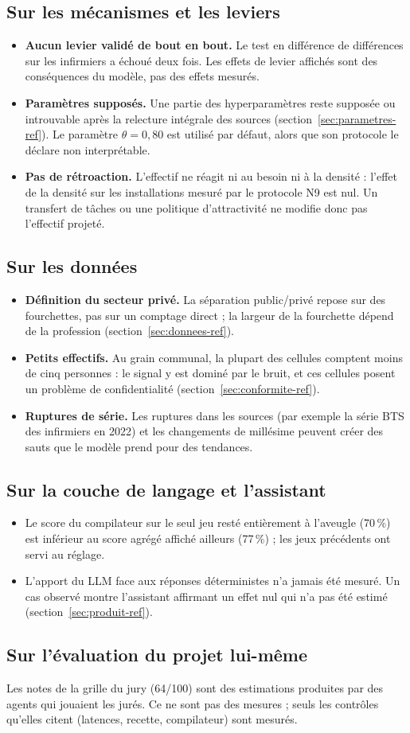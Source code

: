 \subsection{Sur les mécanismes et les leviers}
\begin{itemize}
\item \textbf{Aucun levier validé de bout en bout.} Le test en différence de différences sur les infirmiers a
  échoué deux fois. Les effets de levier affichés sont des conséquences du modèle, pas des effets mesurés.
\item \textbf{Paramètres supposés.} Une partie des hyperparamètres reste supposée ou introuvable après la relecture
  intégrale des sources (section~\ref{sec:parametres-ref}). Le paramètre $\theta = 0{,}80$ est utilisé par défaut,
  alors que son protocole le déclare non interprétable.
\item \textbf{Pas de rétroaction.} L'effectif ne réagit ni au besoin ni à la densité : l'effet de la densité sur les
  installations mesuré par le protocole N9 est nul. Un transfert de tâches ou une politique d'attractivité ne
  modifie donc pas l'effectif projeté.
\end{itemize}

\subsection{Sur les données}
\begin{itemize}
\item \textbf{Définition du secteur privé.} La séparation public/privé repose sur des fourchettes, pas sur un
  comptage direct ; la largeur de la fourchette dépend de la profession (section~\ref{sec:donnees-ref}).
\item \textbf{Petits effectifs.} Au grain communal, la plupart des cellules comptent moins de cinq personnes : le
  signal y est dominé par le bruit, et ces cellules posent un problème de confidentialité
  (section~\ref{sec:conformite-ref}).
\item \textbf{Ruptures de série.} Les ruptures dans les sources (par exemple la série BTS des infirmiers en 2022)
  et les changements de millésime peuvent créer des sauts que le modèle prend pour des tendances.
\end{itemize}

\subsection{Sur la couche de langage et l'assistant}
\begin{itemize}
\item Le score du compilateur sur le seul jeu resté entièrement à l'aveugle (70\,\%\mesure) est inférieur au score
  agrégé affiché ailleurs (77\,\%) ; les jeux précédents ont servi au réglage.
\item L'apport du LLM face aux réponses déterministes n'a jamais été mesuré. Un cas observé montre l'assistant
  affirmant un effet nul qui n'a pas été estimé (section~\ref{sec:produit-ref}).
\end{itemize}

\subsection{Sur l'évaluation du projet lui-même}
Les notes de la grille du jury (64/100) sont des estimations produites par des agents qui jouaient les jurés. Ce ne
sont pas des mesures ; seuls les contrôles qu'elles citent (latences, recette, compilateur) sont mesurés.
